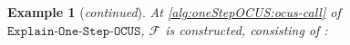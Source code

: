 \documentclass[twoside,11pt]{article}
\newcommand\m[1]{\mathcal{#1}}
\newtheorem{example}{Example}
\newcommand\comment[1]{\marginpar{\tiny #1}}
\renewcommand\comment[1]{#1}
\newcommand{\emilio}[1]{{\comment{\color{red}Emilio: #1}}}
\newcommand{\bart}[1]{{\comment{\color{OliveGreen}Bart: #1}}}
\newcommand\Iend{\ensuremath{I_\mathit{end} }\xspace}
\newcommand\formula{\ensuremath{\m{F} }\xspace}
\newcommand\formulac{\ensuremath{\m{C} }\xspace}
\newcommand\formularunning{\ensuremath{C }\xspace}
\newcommand\mm[1]{\ensuremath{#1}\xspace}
\newcommand\call[1]{\mm{\texttt{#1}}}
\newcommand\comus{\mm{\call{OCUS}}}
\newcommand\onestepo{\ensuremath{\call{Explain-One-Step-OCUS}}\xspace}
\begin{document}
\begin{example}[\textit{continued}]
%	
At \cref{alg:oneStepOCUS:ocus-call} of \onestepo, $\m{F}$ is constructed, consisting of :

\end{example}
\end{document}
